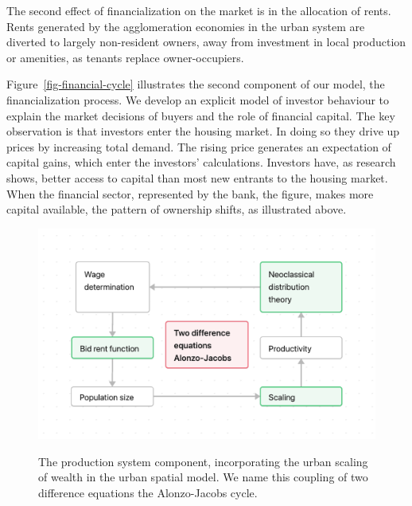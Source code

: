 The second effect of financialization on the market is in the allocation of rents. Rents generated by the agglomeration economies in the urban system are diverted to largely non-resident owners, away from investment in local production or amenities, as tenants replace owner-occupiers. %

Figure~\ref{fig-financial-cycle} illustrates the second component of our model, the financialization process. We develop an explicit model of investor behaviour to explain the market decisions of buyers and the role of financial capital. 
The key observation is that investors enter the housing market. In doing so they drive up prices by increasing total demand. The rising price generates an expectation of capital gains, which enter the investors' calculations. Investors have, as research shows, better access to capital than most new entrants to the housing market. When the financial sector, represented by the bank, the figure, %
makes more capital available, the pattern of ownership shifts, as illustrated above. %

\begin{figure}[!ht]
    \centering
    \includegraphics[scale=.7]{fig/flow_alonzo-jacobs_cycle.png}
    \label{fig-alonzo-jacobs-cycle}
\caption[Production system.]{The production system component, incorporating the urban scaling of wealth in the urban spatial model. We name this coupling of two difference equations the Alonzo-Jacobs cycle.}
\end{figure}

